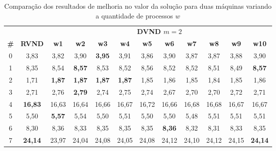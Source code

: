 \begin{table}[htbp]
\caption{Comparação dos resultados de melhoria no valor da solução para duas máquinas variando a quantidade de processos $w$}
\begin{center}
\begin{tabular}{cccccccccccc}
\hline
\hline
\multicolumn{2}{c}{} &\multicolumn{10}{c}{\textbf{DVND $m=2$}} \\
\cline{3-12}
\textbf{\#} & \textbf{RVND}& \textbf{w1}& \textbf{w2}& \textbf{w3}& \textbf{w4}& \textbf{w5}& \textbf{w6}& \textbf{w7}& \textbf{w8}& \textbf{w9}& \textbf{w10} \\
\hline
0 & 3,83& 3,82& 3,90& \textbf{3,95}& 3,91& 3,86& 3,90& 3,87& 3,87& 3,88& 3,90 \\
1 & 8,35& 8,54& \textbf{8,57}& 8,53& 8,52& 8,56& 8,52& 8,52& 8,51& 8,49& \textbf{8,57} \\
2 & 1,71& \textbf{1,87}& \textbf{1,87}& \textbf{1,87}& \textbf{1,87}& 1,85& 1,86& 1,85& 1,84& 1,85& 1,86 \\
3 & 2,71& 2,76& \textbf{2,79}& 2,74& 2,75& 2,74& 2,67& 2,70& 2,70& 2,72& 2,71 \\
4 &\textbf{16,83}&16,63&16,64&16,66&16,67&16,72&16,66&16,68&16,68&16,67&16,67 \\
5 & 5,50& \textbf{5,57}& 5,54& 5,50& 5,51& 5,50& 5,50& 5,48& 5,51& 5,51& 5,51 \\
6 & 8,30& 8,36& 8,33& 8,35& 8,35& 8,35& \textbf{8,36}& 8,32& 8,31& 8,33& 8,35 \\
7 &\textbf{24,14}&23,97&24,04&24,08&24,05&24,08&24,12&24,10&24,12&24,15&\textbf{24,14} \\
\hline
\end{tabular}
\label{tab:rvndDvndN2imp}
\end{center}
\end{table}

